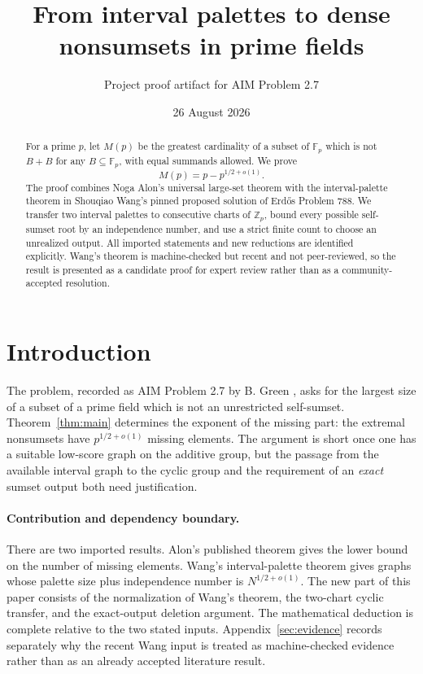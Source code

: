 \documentclass[11pt]{article}
\title{From interval palettes to dense nonsumsets in prime fields}
\author{Project proof artifact for AIM Problem 2.7}
\date{26 August 2026}
\theoremstyle{definition}
\begin{document}
\maketitle

\begin{abstract}
For a prime $p$, let $M(p)$ be the greatest cardinality of a subset of
$\mathbb F_p$ which is not $B+B$ for any $B\subseteq\mathbb F_p$, with equal
summands allowed.  We prove
\[
  M(p)=p-p^{1/2+o(1)}.
\]
The proof combines Noga Alon's universal large-set theorem with the
interval-palette theorem in Shouqiao Wang's pinned proposed solution of
Erd\H{o}s Problem 788.  We transfer two interval palettes to consecutive
charts of $\mathbb Z_p$, bound every possible self-sumset root by an
independence number, and use a strict finite count to choose an unrealized
output.  All imported statements and new reductions are identified
explicitly.  Wang's theorem is machine-checked but recent and not
peer-reviewed, so the result is presented as a candidate proof for expert
review rather than as a community-accepted resolution.
\end{abstract}

\section{Introduction}

The problem, recorded as AIM Problem 2.7 by B. Green \cite{AIM2004}, asks for
the largest size of a subset of a prime field which is not an unrestricted
self-sumset.  Theorem~\ref{thm:main} determines the exponent of the missing
part: the extremal nonsumsets have $p^{1/2+o(1)}$ missing elements.  The
argument is short once one has a suitable low-score graph on the additive
group, but the passage from the available interval graph to the cyclic group
and the requirement of an \emph{exact} sumset output both need justification.

\paragraph{Contribution and dependency boundary.}
There are two imported results.  Alon's published theorem gives the lower
bound on the number of missing elements.  Wang's interval-palette theorem
gives graphs whose palette size plus independence number is
$N^{1/2+o(1)}$.  The new part of this paper consists of the normalization of
Wang's theorem, the two-chart cyclic transfer, and the exact-output deletion
argument.  The mathematical deduction is complete relative to the two stated
inputs.  Appendix~\ref{sec:evidence} records separately why the recent Wang
input is treated as machine-checked evidence rather than as an already
accepted literature result.
\end{document}
